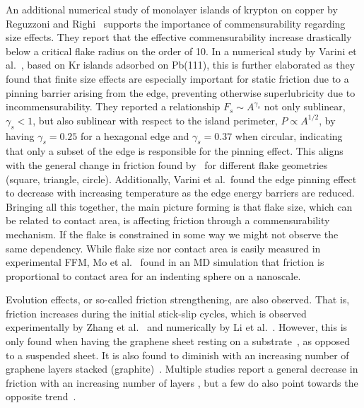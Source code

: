 An additional numerical study of monolayer islands of krypton on copper by
Reguzzoni and Righi~\cite{PhysRevB.85.201412} supports the importance of
commensurability regarding size effects. They report that the effective
commensurability increase drastically below a critical flake radius on the order
of \SI{10}{}. In a numerical study by Varini et al.~\cite{Varini_2015}, based on
Kr islands adsorbed on Pb(111), this is further elaborated as they found that
finite size effects are especially important for static friction due to a
pinning barrier arising from the edge, preventing otherwise superlubricity due
to incommensurability. They reported a relationship $F_s \sim A^{\gamma_s}$ not
only sublinear, $\gamma_s < 1$, but also sublinear with respect to the island
perimeter, $P \propto A^{1/2}$, by having $\gamma_s = 0.25$ for a hexagonal edge
and $\gamma_s = 0.37$ when circular, indicating that only a subset of the edge
is responsible for the pinning effect. This aligns with the general change in
friction found by~\cite{zhu_study_2018} for different flake geometries (square,
triangle, circle). Additionally, Varini et al.\ found the edge pinning effect to
decrease with increasing temperature as the edge energy barriers are reduced.
Bringing all this together, the main picture forming is that flake size, which
can be related to contact area, is affecting friction through a commensurability
mechanism. If the flake is constrained in some way we might not observe the same
dependency. While flake size nor contact area is easily measured in experimental
\acrshort{FFM}, Mo et al.~\cite{mo_friction_2009} found in an \acrshort{MD} simulation that friction is proportional to contact area for an indenting sphere on a nanoscale.



Evolution effects, or so-called friction strengthening, are also observed. That
is, friction increases during the initial stick-slip cycles, which is observed
experimentally by Zhang et al.~\cite{zhang_tuning_2019} and numerically by Li
et al.~\cite{li_evolving_2016}. However, this is only found when having the
graphene sheet resting on a substrate~\cite{zhang_tuning_2019}, as opposed to a
suspended sheet. It is also found to diminish with an increasing number of
graphene layers stacked (graphite)~\cite{li_evolving_2016}. Multiple studies report a general decrease in friction with an increasing number of layers \cite{li_evolving_2016, Yoon2015MolecularDS, Paolicelli_2015, Filleter_2009, Lee_2010}, but a few do also point towards the opposite trend~\cite{Reguzzoni_2012}.


